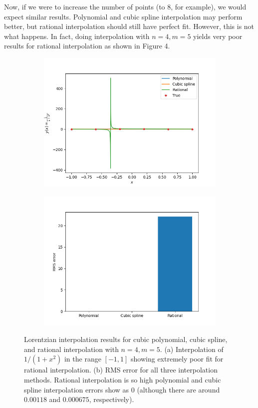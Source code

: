 \documentclass{article}
\begin{document}
Now, if we were to increase the number of points (to 8, for example), we would expect similar results. Polynomial and cubic spline interpolation may perform better, but rational interpolation should still have perfect fit. However, this is not what happens. In fact, doing interpolation with $n=4, m=5$ yields very poor results for rational interpolation as shown in Figure 4.
\begin{figure}[h!]
\centering
\begin{subfigure}{.5\textwidth}
  \centering
  \includegraphics[width=\linewidth]{images/prob3_lorentzian_func.png}
  \caption{}
\end{subfigure}%
\begin{subfigure}{.5\textwidth}
  \centering
  \includegraphics[width=\linewidth]{images/prob3_lorentzian_errs.png}
  \caption{}
\end{subfigure}
\caption{Lorentzian interpolation results for cubic polynomial, cubic spline, and rational interpolation with $n=4, m=5$. (a) Interpolation of $1/(1+x^2)$ in the range $[-1, 1]$ showing extremely poor fit for rational interpolation. (b) RMS error for all three interpolation methods. Rational interpolation is so high polynomial and cubic spline interpolation errors show as 0 (although there are around $0.00118$ and $0.000675$, respectively).}
\label{fig:lorentzian_4points_results}
\end{figure}
\end{document}
